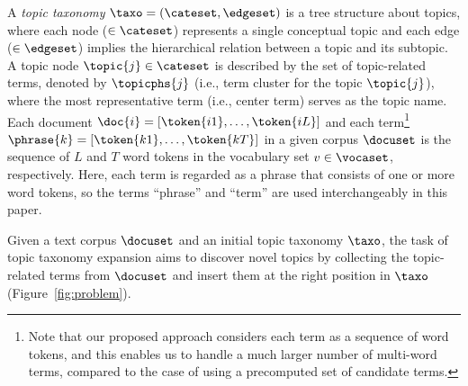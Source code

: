 
A \textit{topic taxonomy} $\taxo=(\cateset, \edgeset)$ is a tree structure about topics, where each node ($\in\cateset$) represents a single conceptual topic and each edge ($\in\edgeset$) implies the hierarchical relation between a topic and its subtopic.
A topic node $\topic{j}\in\cateset$ is described by the set of topic-related terms, denoted by $\topicphs{j}$ (i.e., term cluster for the topic $\topic{j}$), where the most representative term (i.e., center term) serves as the topic name.
Each document $\doc{i}=[\token{i1}, \ldots, \token{iL}]$ and each term\footnote{Note that our proposed approach considers each term as a sequence of word tokens, and this enables us to handle a much larger number of multi-word terms, compared to the case of using a precomputed set of candidate terms.}
$\phrase{k}=[\token{k1}, \ldots, \token{kT}]$ in a given corpus $\docuset$ is the sequence of $L$ and $T$ word tokens in the vocabulary set $v\in\vocaset$, respectively.
Here, each term is regarded as a phrase that consists of one or more word tokens, so the terms ``phrase'' and ``term'' are used interchangeably in this paper.

Given a text corpus $\docuset$ and an initial topic taxonomy $\taxo$, the task of topic taxonomy expansion aims to discover novel topics by collecting the topic-related terms from $\docuset$ and insert them at the right position in $\taxo$ (Figure~\ref{fig:problem}).

